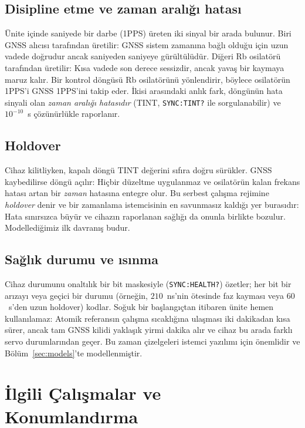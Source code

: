 \documentclass[9pt,twocolumn,a4paper]{extarticle}
\begin{document}
\subsection{Disipline etme ve zaman aralığı hatası}
Ünite içinde saniyede bir darbe (1PPS) üreten iki sinyal bir arada bulunur. Biri GNSS alıcısı tarafından üretilir: GNSS sistem zamanına bağlı olduğu için uzun vadede doğrudur ancak saniyeden saniyeye gürültülüdür. Diğeri Rb osilatörü tarafından üretilir: Kısa vadede son derece sessizdir, ancak yavaş bir kaymaya maruz kalır. Bir kontrol döngüsü Rb osilatörünü yönlendirir, böylece osilatörün 1PPS'i GNSS 1PPS'ini takip eder. İkisi arasındaki anlık fark, döngünün hata sinyali olan \emph{zaman aralığı hatasıdır} (TINT, \texttt{SYNC:TINT?} ile sorgulanabilir) ve $10^{-10}$~s çözünürlükle raporlanır.

\subsection{Holdover}
Cihaz kilitliyken, kapalı döngü TINT değerini sıfıra doğru sürükler. GNSS kaybedilirse döngü açılır: Hiçbir düzeltme uygulanmaz ve osilatörün kalan frekans hatası artan bir \emph{zaman} hatasına entegre olur. Bu serbest çalışma rejimine \emph{holdover} denir ve bir zamanlama istemcisinin en savunmasız kaldığı yer burasıdır: Hata sınırsızca büyür ve cihazın raporlanan sağlığı da onunla birlikte bozulur. Modellediğimiz ilk davranış budur.

\subsection{Sağlık durumu ve ısınma}
Cihaz durumunu onaltılık bir bit maskesiyle (\texttt{SYNC:HEALTH?}) özetler; her bit bir arızayı veya geçici bir durumu (örneğin, $210$~ns'nin ötesinde faz kayması veya $60$~s'den uzun holdover) kodlar. Soğuk bir başlangıçtan itibaren ünite hemen kullanılamaz: Atomik referansın çalışma sıcaklığına ulaşması iki dakikadan kısa sürer, ancak tam GNSS kilidi yaklaşık yirmi dakika alır ve cihaz bu arada farklı servo durumlarından geçer. Bu zaman çizelgeleri istemci yazılımı için önemlidir ve Bölüm~\ref{sec:models}'te modellenmiştir.

\section{İlgili Çalışmalar ve Konumlandırma}
\label{sec:related}
\end{document}
